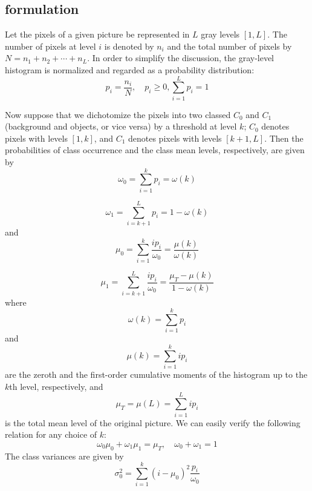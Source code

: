 \subsection*{formulation}


Let the pixels of a given picture be represented in $L$ gray levels $[1,L]$.  The number of pixels at level $i$ is denoted by $n_i$ and the total number of pixels by $N=n_1+n_2+\cdots+n_L$. In order to simplify the discussion, the gray-level histogram is normalized and regarded as a probability distribution:
\begin{equation}
  \label{eq2:1}
  p_i=\frac{n_i}{N},\quad p_i\geqslant 0,\sum_{i=1}^Lp_i=1
\end{equation}

Now suppose that we dichotomize the pixels into two classed $C_0$ and $C_1$(background and objects, or vice versa) by a threshold at level $k$; $C_0$ denotes pixels with levels $[1,k]$, and $C_1$ denotes pixels with levels $[k+1,L]$. Then the probabilities of class occurrence and the class mean levels, respectively, are given by
\begin{equation}
  \label{eq2:2}
  \omega_0=\sum_{i=1}^kp_i=\omega(k)
\end{equation}

\begin{equation}
  \label{eq2:3}
  \omega_1=\sum_{i=k+1}^Lp_i=1-\omega(k)
\end{equation}
and
\begin{equation}
  \label{eq2:4}
  \mu_0=\sum_{i=1}^k\frac{ip_i}{\omega_0}=\frac{\mu(k)}{\omega(k)}
\end{equation}

\begin{equation}
  \label{eq2:5}
  \mu_1=\sum_{i=k+1}^L\frac{ip_i}{\omega_0}=\frac{\mu_T-\mu(k)}{1-\omega(k)}
\end{equation}
where
\begin{equation}
  \label{eq2:6}
  \omega(k)=\sum_{i=1}^kp_i
\end{equation}
and
\begin{equation}
  \label{eq2:7}
  \mu(k)=\sum_{i=1}^kip_i
\end{equation}
are the zeroth and the first-order cumulative moments of the histogram up to the $k$th level, respectively, and
\begin{equation}
  \label{eq2:8}
  \mu_T=\mu(L)=\sum_{i=1}^Lip_i
\end{equation}
is the total mean level of the original picture. We can easily verify the following relation for any choice of $k$:
\begin{equation}
  \label{eq2:9}
  \omega_0\mu_0+\omega_1\mu_1=\mu_T,\quad\omega_0+\omega_1=1
\end{equation}
The class variances are given by
\begin{equation}
  \label{eq2:10}
  \sigma_0^2=\sum_{i=1}^k(i-\mu_0)^2\frac{p_i}{\omega_0}
\end{equation}

